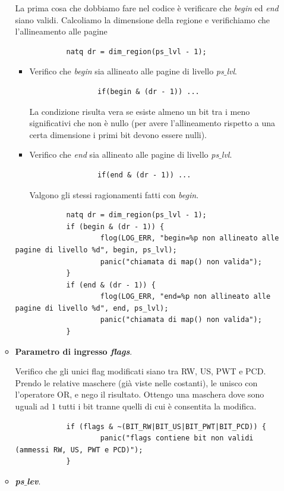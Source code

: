 \documentclass[11pt]{report}
\theoremstyle{definition}
\begin{document}
\begin{itemize}
\begin{itemize}
		La prima cosa che dobbiamo fare nel codice è verificare che \emph{begin} ed \emph{end} siano validi. Calcoliamo la dimensione della regione e verifichiamo che l'allineamento alle pagine
		\begin{verbatim}
			natq dr = dim_region(ps_lvl - 1);
		\end{verbatim}
		\begin{itemize}
			\item  Verifico che \emph{begin} sia allineato alle pagine di livello \emph{ps$\_$lvl}.
			\begin{verbatim}
				if(begin & (dr - 1)) ...
			\end{verbatim}
			La condizione risulta vera se esiste almeno un bit tra i meno significativi che non è nullo (per avere l'allineamento rispetto a una certa dimensione i primi bit devono essere nulli).
			\item  Verifico che \emph{end} sia allineato alle pagine di livello \emph{ps$\_$lvl}. 
			\begin{verbatim}
				if(end & (dr - 1)) ...	\end{verbatim}
			Valgono gli stessi ragionamenti fatti con \emph{begin}.
		\end{itemize}
		\small
		\begin{verbatim}
			natq dr = dim_region(ps_lvl - 1);
			if (begin & (dr - 1)) {
				    flog(LOG_ERR, "begin=%p non allineato alle pagine di livello %d", begin, ps_lvl);
				    panic("chiamata di map() non valida");
			}
			if (end & (dr - 1)) {
				    flog(LOG_ERR, "end=%p non allineato alle pagine di livello %d", end, ps_lvl);
				    panic("chiamata di map() non valida");
			}
		\end{verbatim}
		\normalsize 
		\item \textbf{Parametro di ingresso \emph{flags}}. 
		
		\noindent Verifico che gli unici flag modificati siano tra RW, US, PWT e PCD. Prendo le relative maschere (già viste nelle costanti), le unisco con l'operatore OR, e nego il risultato. Ottengo una maschera dove sono uguali ad $1$ tutti i bit tranne quelli di cui è consentita la modifica.
		\small
		\begin{verbatim}
			if (flags & ~(BIT_RW|BIT_US|BIT_PWT|BIT_PCD)) {
				    panic("flags contiene bit non validi (ammessi RW, US, PWT e PCD)");
			}
		\end{verbatim}
		\normalsize
		
		\item \textbf{\emph{ps$\_$lev}}.
		

\end{itemize}
\end{itemize}
\end{document}
